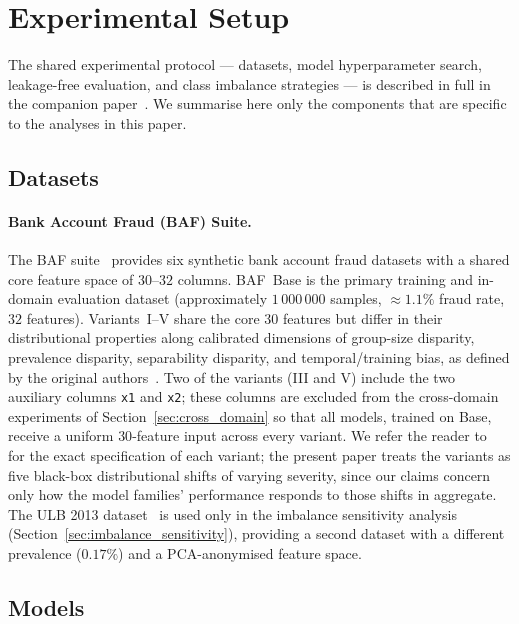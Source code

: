 \documentclass[a4paper,fleqn]{cas-sc}
\begin{document}
\section{Experimental Setup}
\label{sec:setup}

The shared experimental protocol --- datasets, model hyperparameter search,
leakage-free evaluation, and class imbalance strategies --- is described in full
in the companion paper~\citep{caixeiro2025threshold}.
We summarise here only the components that are specific to the analyses in this paper.

\subsection{Datasets}

\paragraph{Bank Account Fraud (BAF) Suite.}
The BAF suite~\citep{jesus2022turning} provides six synthetic bank account fraud
datasets with a shared core feature space of $30$--$32$ columns.
BAF~Base is the primary training and in-domain evaluation dataset
(approximately $1\,000\,000$ samples, $\approx 1.1\%$ fraud rate, $32$ features).
Variants~I--V share the core $30$ features but differ in their distributional
properties along calibrated dimensions of group-size disparity, prevalence
disparity, separability disparity, and temporal/training bias, as defined by
the original authors~\citep{jesus2022turning}.
Two of the variants (III and V) include the two auxiliary columns
\texttt{x1} and \texttt{x2}; these columns are excluded from the cross-domain
experiments of Section~\ref{sec:cross_domain} so that all models, trained on
Base, receive a uniform $30$-feature input across every variant.
We refer the reader to~\citet{jesus2022turning} for the exact specification of
each variant; the present paper treats the variants as five black-box
distributional shifts of varying severity, since our claims concern only how
the model families' performance responds to those shifts in aggregate.
The ULB 2013 dataset~\citep{dalpozzolo2015calibrating} is used only in the
imbalance sensitivity analysis (Section~\ref{sec:imbalance_sensitivity}),
providing a second dataset with a different prevalence ($0.17\%$) and a
PCA-anonymised feature space.

\subsection{Models}
\end{document}
